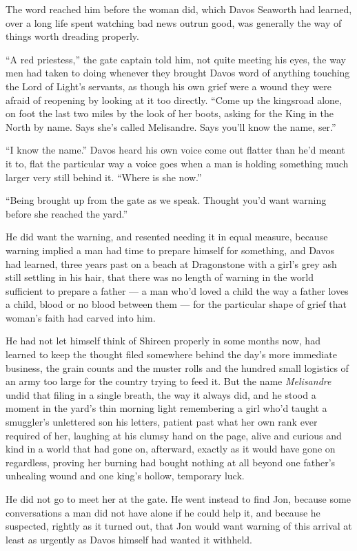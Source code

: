 The word reached him before the woman did, which Davos Seaworth had learned, over a long life spent watching bad news outrun good, was generally the way of things worth dreading properly.

“A red priestess,” the gate captain told him, not quite meeting his eyes, the way men had taken to doing whenever they brought Davos word of anything touching the Lord of Light’s servants, as though his own grief were a wound they were afraid of reopening by looking at it too directly. “Come up the kingsroad alone, on foot the last two miles by the look of her boots, asking for the King in the North by name. Says she’s called Melisandre. Says you’ll know the name, ser.”

“I know the name.” Davos heard his own voice come out flatter than he’d meant it to, flat the particular way a voice goes when a man is holding something much larger very still behind it. “Where is she now.”

“Being brought up from the gate as we speak. Thought you’d want warning before she reached the yard.”

He did want the warning, and resented needing it in equal measure, because warning implied a man had time to prepare himself for something, and Davos had learned, three years past on a beach at Dragonstone with a girl’s grey ash still settling in his hair, that there was no length of warning in the world sufficient to prepare a father — a man who’d loved a child the way a father loves a child, blood or no blood between them — for the particular shape of grief that woman’s faith had carved into him.

He had not let himself think of Shireen properly in some months now, had learned to keep the thought filed somewhere behind the day’s more immediate business, the grain counts and the muster rolls and the hundred small logistics of an army too large for the country trying to feed it. But the name \textit{Melisandre} undid that filing in a single breath, the way it always did, and he stood a moment in the yard’s thin morning light remembering a girl who’d taught a smuggler’s unlettered son his letters, patient past what her own rank ever required of her, laughing at his clumsy hand on the page, alive and curious and kind in a world that had gone on, afterward, exactly as it would have gone on regardless, proving her burning had bought nothing at all beyond one father’s unhealing wound and one king’s hollow, temporary luck.

He did not go to meet her at the gate. He went instead to find Jon, because some conversations a man did not have alone if he could help it, and because he suspected, rightly as it turned out, that Jon would want warning of this arrival at least as urgently as Davos himself had wanted it withheld.

